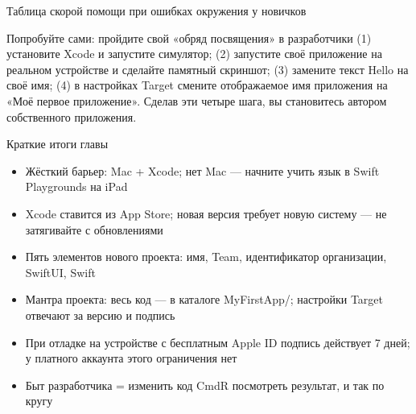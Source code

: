 \begin{center}\small\color{gray}Таблица скорой помощи при ошибках окружения у новичков\end{center}

\begin{tcbpractice}{Попробуйте сами: пройдите свой «обряд посвящения» в разработчики}
(1) установите Xcode и запустите симулятор; (2) запустите своё приложение на реальном устройстве и сделайте памятный скриншот; (3) замените текст Hello на своё имя; (4) в настройках Target смените отображаемое имя приложения на «Моё первое приложение». Сделав эти четыре шага, вы становитесь автором собственного приложения.

\end{tcbpractice}

\begin{tcbsummary}{Краткие итоги главы}
\begin{itemize}
  \item Жёсткий барьер: Mac + Xcode; нет Mac — начните учить язык в Swift Playgrounds на iPad
  \item Xcode ставится из App Store; новая версия требует новую систему — не затягивайте с обновлениями
  \item Пять элементов нового проекта: имя, Team, идентификатор организации, SwiftUI, Swift
  \item Мантра проекта: весь код — в каталоге MyFirstApp/; настройки Target отвечают за версию и подпись
  \item При отладке на устройстве с бесплатным Apple ID подпись действует 7 дней; у платного аккаунта этого ограничения нет
  \item Быт разработчика = изменить код CmdR посмотреть результат, и так по кругу
\end{itemize}

\end{tcbsummary}
